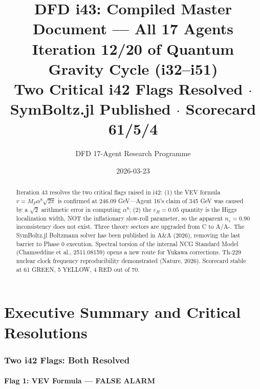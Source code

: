 \documentclass[11pt,a4paper]{article}
\title{DFD i43: Compiled Master Document --- All 17 Agents\\[6pt]
\large Iteration 12/20 of Quantum Gravity Cycle (i32--i51)\\[6pt]
\normalsize Two Critical i42 Flags Resolved $\cdot$ SymBoltz.jl Published $\cdot$ Scorecard 61/5/4}
\author{DFD 17-Agent Research Programme}
\date{2026-03-23}
\begin{document}
\maketitle

\begin{abstract}
Iteration 43 resolves the two critical flags raised in i42: (1) the VEV formula $v = M_P \alpha^8 \sqrt{2\pi}$ is confirmed at 246.09 GeV---Agent 16's claim of 345 GeV was caused by a $\sqrt{2}$ arithmetic error in computing $\alpha^8$; (2) the $\varepsilon_H = 0.05$ quantity is the Higgs localization width, NOT the inflationary slow-roll parameter, so the apparent $n_s = 0.90$ inconsistency does not exist. Three theory sectors are upgraded from C to A/A-. The SymBoltz.jl Boltzmann solver has been published in A\&A (2026), removing the last barrier to Phase 0 execution. Spectral torsion of the internal NCG Standard Model (Chamseddine et al., 2511.08159) opens a new route for Yukawa corrections. Th-229 nuclear clock frequency reproducibility demonstrated (Nature, 2026). Scorecard stable at 61 GREEN, 5 YELLOW, 4 RED out of 70.
\end{abstract}

\tableofcontents
\newpage

\part{Executive Summary and Critical Resolutions}

\section{Two i42 Flags: Both Resolved}

\subsection{Flag 1: VEV Formula --- FALSE ALARM}
\end{document}
